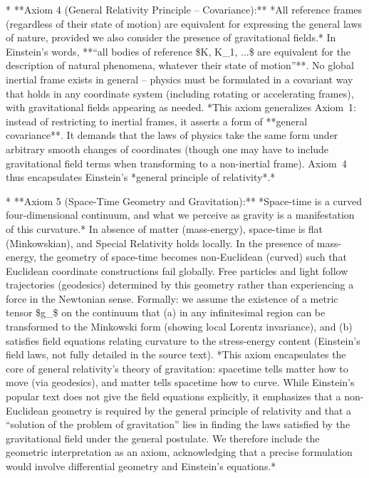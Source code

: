 \documentclass{article}
\begin{document}
* **Axiom 4 (General Relativity Principle – Covariance):** *All reference frames (regardless of their state of motion) are equivalent for expressing the general laws of nature, provided we also consider the presence of gravitational fields.* In Einstein’s words, **“all bodies of reference \$K, K\_1, ...\$ are equivalent for the description of natural phenomena, whatever their state of motion”**. No global inertial frame exists in general – physics must be formulated in a covariant way that holds in any coordinate system (including rotating or accelerating frames), with gravitational fields appearing as needed. *This axiom generalizes Axiom 1: instead of restricting to inertial frames, it asserts a form of **general covariance**. It demands that the laws of physics take the same form under arbitrary smooth changes of coordinates (though one may have to include gravitational field terms when transforming to a non-inertial frame). Axiom 4 thus encapsulates Einstein’s *general principle of relativity*.*

* **Axiom 5 (Space-Time Geometry and Gravitation):** *Space-time is a curved four-dimensional continuum, and what we perceive as gravity is a manifestation of this curvature.* In absence of matter (mass-energy), space-time is flat (Minkowskian), and Special Relativity holds locally. In the presence of mass-energy, the geometry of space-time becomes non-Euclidean (curved) such that Euclidean coordinate constructions fail globally. Free particles and light follow trajectories (geodesics) determined by this geometry rather than experiencing a force in the Newtonian sense. Formally: we assume the existence of a metric tensor \$g\_{\mu\nu}\$ on the continuum that (a) in any infinitesimal region can be transformed to the Minkowski form (showing local Lorentz invariance), and (b) satisfies field equations relating curvature to the stress-energy content (Einstein’s field laws, not fully detailed in the source text). *This axiom encapsulates the core of general relativity’s theory of gravitation: spacetime tells matter how to move (via geodesics), and matter tells spacetime how to curve. While Einstein’s popular text does not give the field equations explicitly, it emphasizes that a non-Euclidean geometry is required by the general principle of relativity and that a “solution of the problem of gravitation” lies in finding the laws satisfied by the gravitational field under the general postulate. We therefore include the geometric interpretation as an axiom, acknowledging that a precise formulation would involve differential geometry and Einstein’s equations.*
\end{document}
